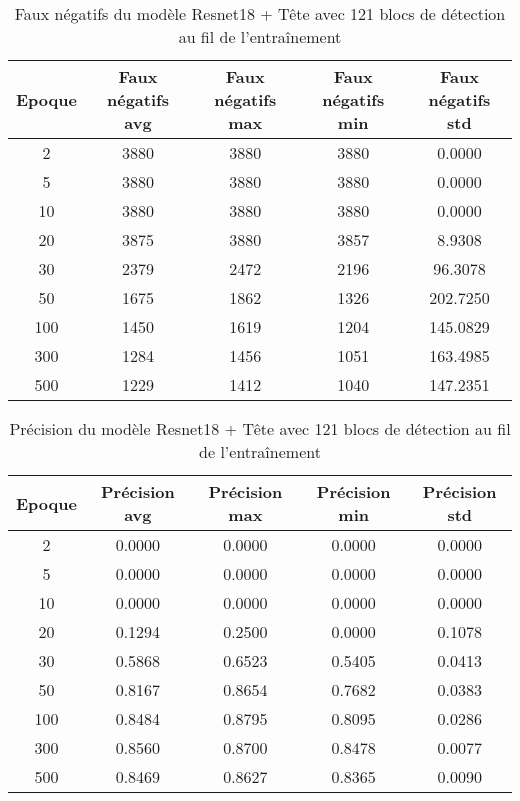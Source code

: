 \begin{table}[!ht]
    \caption{Faux négatifs du modèle Resnet18 + Tête avec 121 blocs de détection au fil de l'entraînement}
    \label{tab:resnet18+head_121n_false_negative}
    \centering
    \begin{tabular}{ |c||c|c|c|c|  }
        \hline
        \rowcolor{gray!50}
        Epoque & Faux négatifs avg & Faux négatifs max & Faux négatifs min & Faux négatifs std\\
        \hline
        2 & 3880 & 3880 & 3880 & 0.0000\\
        5 & 3880 & 3880 & 3880 & 0.0000\\
        10 & 3880 & 3880 & 3880 & 0.0000\\
        20 & 3875 & 3880 & 3857 & 8.9308\\
        30 & 2379 & 2472 & 2196 & 96.3078\\
        50 & 1675 & 1862 & 1326 & 202.7250\\
        100 & 1450 & 1619 & 1204 & 145.0829\\
        300 & 1284 & 1456 & 1051 & 163.4985\\
        500 & 1229 & 1412 & 1040 & 147.2351\\
        \hline
    \end{tabular}
\end{table}

\begin{table}[!ht]
    \caption{Précision du modèle Resnet18 + Tête avec 121 blocs de détection au fil de l'entraînement}
    \label{tab:resnet18+head_121n_precision}
    \centering
    \begin{tabular}{ |c||c|c|c|c|  }
        \hline
        \rowcolor{gray!50}
        Epoque & Précision avg & Précision max & Précision min & Précision std\\
        \hline
        2 & 0.0000 & 0.0000 & 0.0000 & 0.0000\\
        5 & 0.0000 & 0.0000 & 0.0000 & 0.0000\\
        10 & 0.0000 & 0.0000 & 0.0000 & 0.0000\\
        20 & 0.1294 & 0.2500 & 0.0000 & 0.1078\\
        30 & 0.5868 & 0.6523 & 0.5405 & 0.0413\\
        50 & 0.8167 & 0.8654 & 0.7682 & 0.0383\\
        100 & 0.8484 & 0.8795 & 0.8095 & 0.0286\\
        300 & 0.8560 & 0.8700 & 0.8478 & 0.0077\\
        500 & 0.8469 & 0.8627 & 0.8365 & 0.0090\\
        \hline
    \end{tabular}
\end{table}

